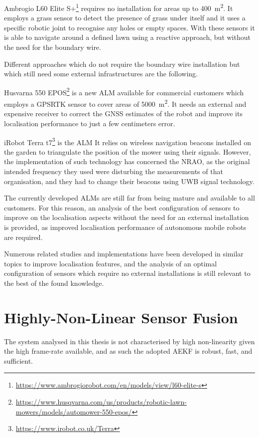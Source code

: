 Ambrogio L60 Elite S+\footnote{\url{https://www.ambrogiorobot.com/en/models/view/l60-elite-s}} requires no installation for areas up to \SI{400}{\meter\squared}.
It employs a grass sensor to detect the presence of grass under itself and it uses a specific robotic joint to recognise any holes or empty spaces. With these sensors it is able to navigate around a defined lawn using a reactive approach, but without the need for the boundary wire.

Different approaches which do not require the boundary wire installation but which still need some external infrastructures are the following.

Husvarna 550 EPOS\footnote{\url{https://www.husqvarna.com/us/products/robotic-lawn-mowers/models/automower-550-epos/}} is a new \gls{ALM} available for commercial customers which employs a \gls{GPSRTK} sensor to cover areas of \SI{5000}{\meter\squared}. It needs an external and expensive receiver to correct the \gls{GNSS} estimates of the robot and improve its localisation performance to just a few centimeters error.

iRobot Terra t7\footnote{\url{https://www.irobot.co.uk/Terra}} is the \gls{ALM}
It relies on wireless navigation beacons installed on the garden to triangulate the position of the mower using their signals. However, the implementation of such technology has concerned the \gls{NRAO}, as the original intended frequency they used were disturbing the measurements of that organisation, and they had to change their beacons using \gls{UWB} signal technology.

The currently developed \glspl{ALM} are still far from being mature and available to all customers.
For this reason, an analysis of the best configuration of sensors to improve on the localisation aspects without the need for an external installation is provided, as improved localisation performance of autonomous mobile robots are required.

Numerous related studies and implementations have been developed in similar topics to improve localisation features, and the analysis of an optimal configuration of sensors which require no external installations is still relevant to the best of the found knowledge.



\chapter{Highly-Non-Linear Sensor Fusion}
\noindent The system analysed in this thesis is not characterised by high non-linearity given the high frame-rate available, and as such the adopted \gls{AEKF} is robust, fast, and sufficient.

